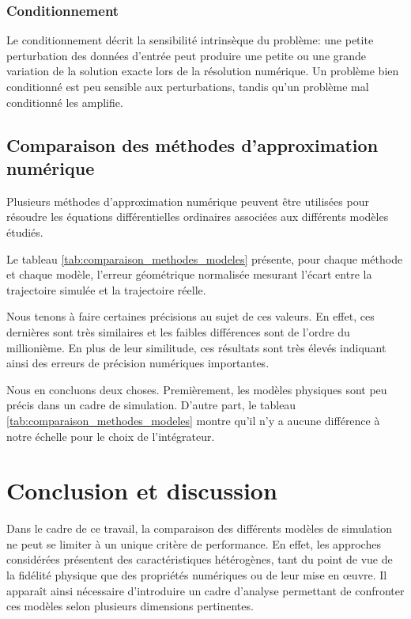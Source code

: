 \documentclass[
	a4paper, %
	10pt, %
	unnumberedsections, %
	twoside, %
]{LTJournalArticle}
\begin{document}
\subsubsection{Conditionnement}
Le conditionnement décrit la sensibilité intrinsèque du problème: une petite perturbation des données d'entrée peut produire une petite ou une grande variation de la solution exacte lors de la résolution numérique.
Un problème bien conditionné est peu sensible aux perturbations, tandis qu'un problème mal conditionné les amplifie.

\subsection{Comparaison des méthodes d’approximation numérique}
Plusieurs méthodes d’approximation numérique peuvent être utilisées pour
résoudre les équations différentielles ordinaires associées aux différents
modèles étudiés.

Le tableau \ref{tab:comparaison_methodes_modeles} présente, pour chaque méthode et chaque modèle, l’erreur
géométrique normalisée mesurant l’écart entre la trajectoire simulée et la
trajectoire réelle.

Nous tenons à faire certaines précisions au sujet de ces valeurs. En effet, ces dernières
sont très similaires et les faibles différences sont de l'ordre du millionième. En plus de leur similitude, ces résultats sont très élevés indiquant ainsi des erreurs de précision numériques
importantes.

Nous en concluons deux choses. Premièrement, les modèles physiques sont peu précis dans un cadre
de simulation. D'autre part, le tableau \ref{tab:comparaison_methodes_modeles} montre qu'il n'y a aucune différence à notre échelle pour le choix de l'intégrateur.


\section{Conclusion et discussion}

Dans le cadre de ce travail, la comparaison des différents modèles de
simulation ne peut se limiter à un unique critère de performance. En effet, les
approches considérées présentent des caractéristiques hétérogènes, tant du
point de vue de la fidélité physique que des propriétés numériques ou de leur
mise en œuvre. Il apparaît ainsi nécessaire d’introduire un cadre d’analyse
permettant de confronter ces modèles selon plusieurs dimensions pertinentes.
\end{document}
